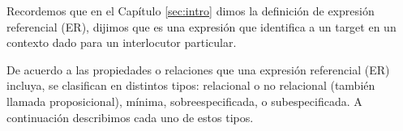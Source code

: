 Recordemos que en el Cap\'itulo \ref{sec:intro} dimos la definici\'on de expresi\'on referencial (ER), dijimos que es una expresi\'on que identifica a un target en un contexto dado para un interlocutor particular.

De acuerdo a las propiedades o relaciones que una expresi\'on referencial (ER) incluya, se clasifican en distintos tipos: relacional o no relacional (tambi\'en llamada proposicional), m\'inima, sobreespecificada, o subespecificada. A continuaci\'on describimos cada uno de estos tipos.
